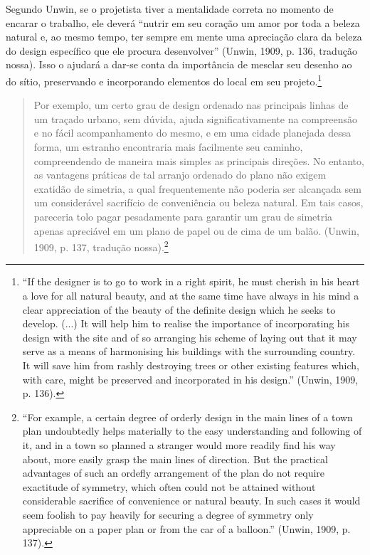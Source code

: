 \documentclass[12pt, a4paper]{book} %
\begin{document}
        Segundo Unwin, se o projetista tiver a mentalidade correta no momento de encarar o trabalho, ele deverá ``nutrir em seu coração um amor por toda a beleza natural e, ao mesmo tempo, ter sempre em mente uma apreciação clara da beleza do design específico que ele procura desenvolver'' (Unwin, 1909, p. 136, tradução nossa). Isso o ajudará a dar-se conta da importância de mesclar seu desenho ao do sítio, preservando e incorporando elementos do local em seu projeto.\footnote[24]{``If the designer is to go to work in a right spirit, he must cherish in his heart a love for all natural beauty, and at the same time have always in his mind a clear appreciation of the beauty of the definite design which he seeks to develop. (...) It will help him to realise the importance of incorporating his design with the site and of so arranging his scheme of laying out that it may serve as a means of harmonising his buildings with the surrounding country. It will save him from rashly destroying trees or other existing features which, with care, might be preserved and incorporated in his design.'' (Unwin, 1909, p. 136).}

        \begin{quotation}
            Por exemplo, um certo grau de design ordenado nas  principais linhas de um traçado urbano, sem dúvida, ajuda significativamente na compreensão e no fácil acompanhamento do mesmo, e em uma cidade planejada dessa forma, um estranho encontraria mais facilmente seu caminho, compreendendo de maneira mais simples as principais direções. No entanto, as vantagens práticas de tal arranjo ordenado do plano não exigem exatidão de simetria, a qual frequentemente não poderia ser alcançada sem um considerável sacrifício de conveniência ou beleza natural. Em tais casos, pareceria tolo pagar pesadamente para garantir um grau de simetria apenas apreciável em um plano de papel ou de cima de um balão. (Unwin, 1909, p. 137, tradução nossa).\footnote[25]{``For example, a certain degree of orderly design in the main lines of a town plan undoubtedly helps materially to the easy understanding and following of it, and in a town so planned a stranger would more readily find his way about, more easily grasp the main lines of direction. But the practical advantages of such an ordefly arrangement of the plan do not require exactitude of symmetry, which often could not be attained without considerable sacrifice of convenience or natural beauty. In such cases it would seem foolish to pay heavily for securing a degree of symmetry only appreciable on a paper plan or from the car of a balloon.'' (Unwin, 1909, p. 137).}
        \end{quotation}
\end{document}
